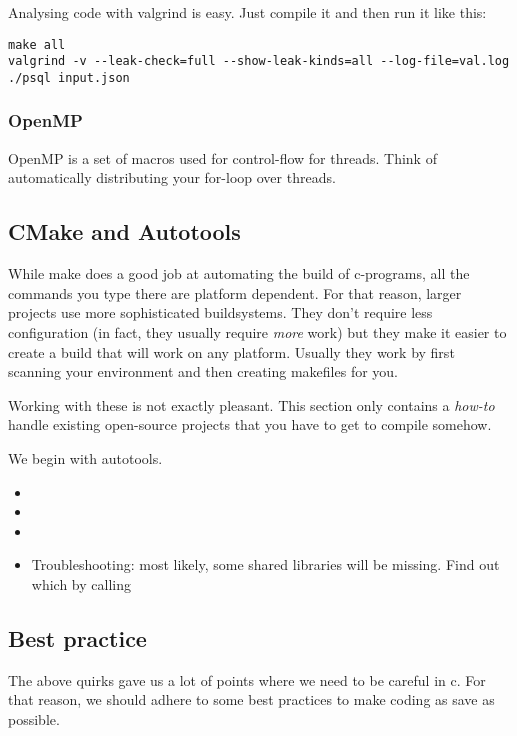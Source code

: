 Analysing code with valgrind is easy. Just compile it and then run it like this:
\begin{lstlisting}
make all
valgrind -v --leak-check=full --show-leak-kinds=all --log-file=val.log ./psql input.json
\end{lstlisting}

\subsubsection{OpenMP}
OpenMP is a set of macros used for control-flow for threads. Think of automatically distributing your for-loop over threads.










\subsection{CMake and Autotools}
While make does a good job at automating the build of c-programs, all the commands you type there are platform dependent. For that reason, larger projects use more sophisticated buildsystems. They don't require less configuration (in fact, they usually require \emph{more} work) but they make it easier to create a build that will work on any platform. Usually they work by first scanning your environment and then creating makefiles for you. 

Working with these is not exactly pleasant. This section only contains a \emph{how-to} handle existing open-source projects that you have to get to compile somehow. 

We begin with autotools. 
\begin{itemize}
    \item {}
    \item {}
    \item {}
    \item Troubleshooting: most likely, some shared libraries will be missing. Find out which by calling \inlinecode{}
\end{itemize}




\subsection{Best practice}

The above quirks gave us a lot of points where we need to be careful in c. 
For that reason, we should adhere to some best practices to make coding as save as possible.

